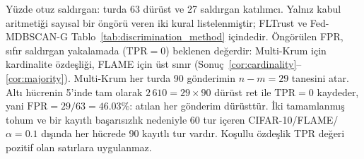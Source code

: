 \begin{table}[!t]
\par\vspace{3pt}\parbox{\linewidth}{\footnotesize Yüzde otuz saldırgan: turda 63 dürüst ve 27 saldırgan katılımcı. Yalnız kabul aritmetiği sayısal bir öngörü veren iki kural listelenmiştir; FLTrust ve Fed-MDBSCAN-G Tablo~\ref{tab:discrimination_method} içindedir. Öngörülen FPR, sıfır saldırgan yakalamada ($\mathrm{TPR}=0$) beklenen değerdir: Multi-Krum için kardinalite özdeşliği, FLAME için üst sınır (Sonuç~\ref{cor:cardinality}--\ref{cor:majority}). Multi-Krum her turda 90 gönderimin $n-m=29$ tanesini atar. Altı hücrenin 5'inde tam olarak $2\,610=29\times90$ dürüst ret ile $\mathrm{TPR}=0$ kaydeder, yani $\mathrm{FPR}=29/63=46.03\%$: atılan her gönderim dürüsttür. İki tamamlanmış tohum ve bir kayıtlı başarısızlık nedeniyle 60 tur içeren CIFAR-10/FLAME/$\alpha=0.1$ dışında her hücrede 90 kayıtlı tur vardır. Koşullu özdeşlik TPR değeri pozitif olan satırlara uygulanmaz.}
\end{table}
